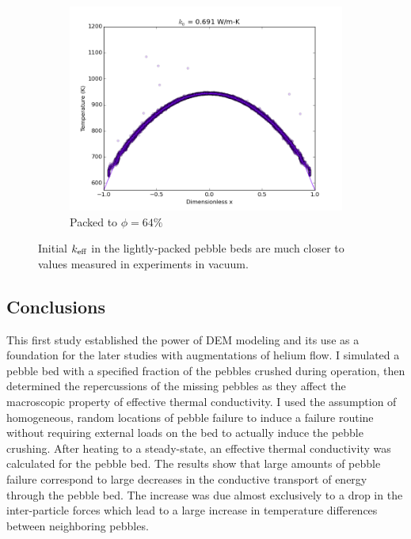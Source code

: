 \begin{figure}[!ht]
    \begin{subfigure}[b]{0.4\textwidth}
        \centering
        \includegraphics[width=\textwidth]{figures/initial_packing_study/64percent-deform-packing.png}
        \caption{Packed to $\phi = 64\%$}
    \end{subfigure}
    \caption{Initial $k_\text{eff}$ in the lightly-packed pebble beds are much closer to values measured in experiments in vacuum.}
\label{fig:keff-initial}
\end{figure}





\FloatBarrier



\subsection{Conclusions}
\label{sec:dem-conclusions}
This first study established the power of DEM modeling and its use as a foundation for the later studies with augmentations of helium flow. I simulated a pebble bed with a specified fraction of the pebbles crushed during operation, then determined the repercussions of the missing pebbles as they affect the macroscopic property of effective thermal conductivity. I used the assumption of homogeneous, random locations of pebble failure to induce a failure routine without requiring external loads on the bed to actually induce the pebble crushing. After heating to a steady-state, an effective thermal conductivity was calculated for the pebble bed. The results show that large amounts of pebble failure correspond to large decreases in the conductive transport of energy through the pebble bed. The increase was due almost exclusively to a drop in the inter-particle forces which lead to a large increase in temperature differences between neighboring pebbles.

